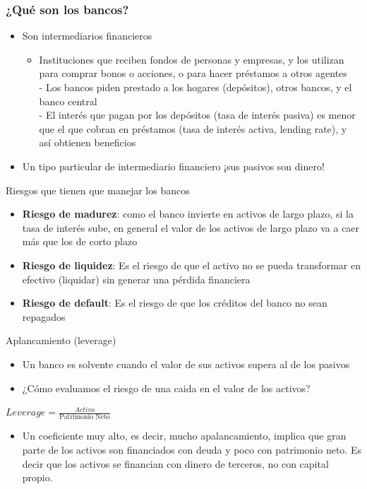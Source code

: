 \documentclass{beamer}
\begin{document}
\begin{frame}
\frametitle{¿Qué son los bancos?}
\begin{itemize}
    \item Son intermediarios financieros
        \begin{itemize}
        \item Instituciones que reciben fondos de personas y empresas, y los utilizan para comprar bonos o acciones, o para hacer préstamos a otros agentes \\
        - Los bancos piden prestado a los hogares (depósitos), otros bancos, y el banco central \\
        - El interés que pagan por los depósitos (tasa de interés pasiva) es menor que el que cobran en préstamos (tasa de interés activa, lending rate), y así obtienen beneficios
        \end{itemize}
    \item Un tipo particular de intermediario financiero
    ¡sus pasivos son dinero!
\end{itemize}
\end{frame}

\begin{frame}{Riesgos que tienen que manejar los bancos}
\begin{itemize}
    \item \textbf{Riesgo de madurez}: como el banco invierte en activos de largo plazo, si la tasa de interés sube, en general el valor de los activos de largo plazo va a caer más que los de corto plazo \vspace{1mm}
    \item \textbf{Riesgo de liquidez}: Es el riesgo de que el activo no se pueda transformar en efectivo (liquidar) sin generar una pérdida financiera \vspace{1mm}
    \item \textbf{Riesgo de default}: Es el riesgo de que los créditos del banco no sean repagados
\end{itemize}
    \end{frame}

\begin{frame}{Aplancamiento (leverage)}
    \begin{itemize}
    \item Un banco es solvente cuando el valor de sus activos supera al de los pasivos
     \item ¿Cómo evaluamos el riesgo de una caida en el valor de los activos?
    \end{itemize}
     \begin{center}
       $ Leverage = \frac{Activo}{\text{Patrimonio Neto}} $
    \end{center} 
    \begin{itemize}
    \item Un coeficiente muy alto, es decir, mucho apalancamiento, implica que gran parte de los activos son financiados con deuda y poco con patrimonio neto. Es decir que los activos se financian con dinero de terceros, no con capital propio.
    \end{itemize}
\end{frame}
\end{document}
